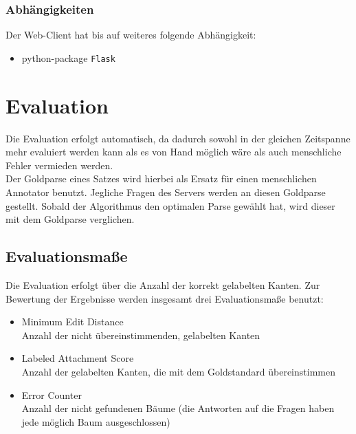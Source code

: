 \documentclass{scrartcl}
\begin{document}
\subsubsection{Abhängigkeiten}
\label{ssub:Web-Client-Abhaengigkeiten}
Der Web-Client hat bis auf weiteres folgende Abhängigkeit:
\begin{itemize}
    \item python-package \texttt{Flask}
\end{itemize}

\section{Evaluation}
Die Evaluation erfolgt automatisch, da dadurch sowohl in der gleichen Zeitspanne mehr evaluiert werden kann als es von Hand möglich wäre als auch menschliche Fehler vermieden werden.\\ Der Goldparse eines Satzes wird hierbei als Ersatz für einen menschlichen Annotator benutzt. Jegliche Fragen des Servers werden an diesen Goldparse gestellt. Sobald der Algorithmus den optimalen Parse gewählt hat, wird dieser mit dem Goldparse verglichen.\\
\subsection{Evaluationsma{\ss}e}
Die Evaluation erfolgt über die Anzahl der korrekt gelabelten Kanten.
Zur Bewertung der Ergebnisse werden insgesamt drei Evaluationsmaße benutzt:
\begin{itemize}
\item Minimum Edit Distance\\
Anzahl der nicht übereinstimmenden, gelabelten Kanten
\item Labeled Attachment Score\\
Anzahl der gelabelten Kanten, die mit dem Goldstandard übereinstimmen
\item Error Counter\\
Anzahl der nicht gefundenen Bäume (die Antworten auf die Fragen haben jede möglich Baum ausgeschlossen)
\end{itemize}
\end{document}

